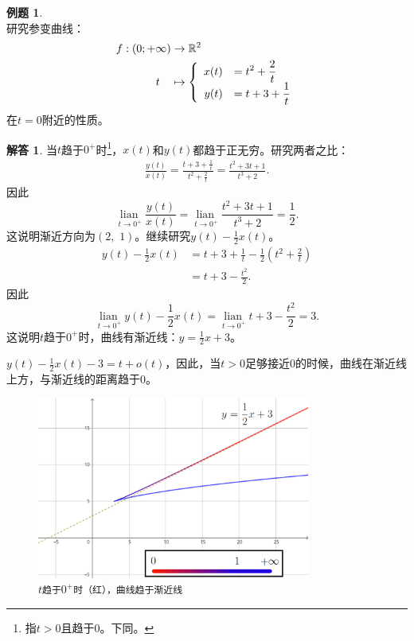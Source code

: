 \documentclass[12pt,UTF8]{ctexbook}
\newcommand{\lian}[1]{
    \underset{#1}{\operatorname{lian}\,}
}
\newcommand{\olim}[1]{\mathit{o}\left(#1\right)}  %
\theoremstyle{definition}
\newtheorem{et}{例题}[section]
\newtheorem*{so}{解答}
\theoremstyle{plain}
\begin{document}
\begin{et}
    \mbox{} \\
    研究参变曲线：%
    \begin{align*}
        f: (0;+\infty) &\rightarrow \mathbb{R}^2 \\
        t\quad &\mapsto\left\{
            \begin{array}[]{rl}
                x(t) &\displaystyle = t^2 + \frac{2}{t} \\
                y(t) &\displaystyle = t + 3 + \frac{1}{t}\\
            \end{array}
        \right.
    \end{align*}
    在$t=0$附近的性质。
\end{et}

\begin{so}
    当$t$趋于$0^+$时\footnote{指$t>0$且趋于$0$。下同。}，$x(t)$和$y(t)$都趋于正无穷。研究两者之比：
    \begin{align*}
        \frac{y(t)}{x(t)} = \frac{t + 3 + \frac{1}{t}}{t^2 + \frac{2}{t}} = \frac{t^2 + 3t + 1}{t^3 + 2}.
    \end{align*}
    因此 
    $$ \lian{t\to 0^+} \frac{y(t)}{x(t)} = \lian{t\to 0^+} \frac{t^2 + 3t + 1}{t^3 + 2} = \frac{1}{2}. $$
    这说明渐近方向为$(2,\,\,1)$。继续研究$y(t) - \frac{1}{2}x(t)$。
    \begin{align*}
        y(t) - \frac{1}{2}x(t) &= t + 3 + \frac{1}{t} - \frac{1}{2}\left(t^2 + \frac{2}{t}\right) \\
        &= t + 3 - \frac{t^2}{2}.
    \end{align*}
    因此
    $$ \lian{t\to 0^+} y(t) - \frac{1}{2}x(t) = \lian{t\to 0^+} t + 3 - \frac{t^2}{2} = 3. $$
    这说明$t$趋于$0^+$时，曲线有渐近线：$y = \frac{1}{2}x + 3$。

    $y(t) - \frac{1}{2}x(t) - 3 = t + \olim{t}$，因此，当$t>0$足够接近$0$的时候，曲线在渐近线上方，与渐近线的距离趋于$0$。
\end{so}

\begin{figure}[h] 
    \centering
    \includegraphics[width=0.8\textwidth]{tu/曲线局部渐近行为02.png}
    \caption*{\texttt{$t$趋于$0^+$时（{\color{red}红}），曲线趋于渐近线}}
\end{figure}
\end{document}
